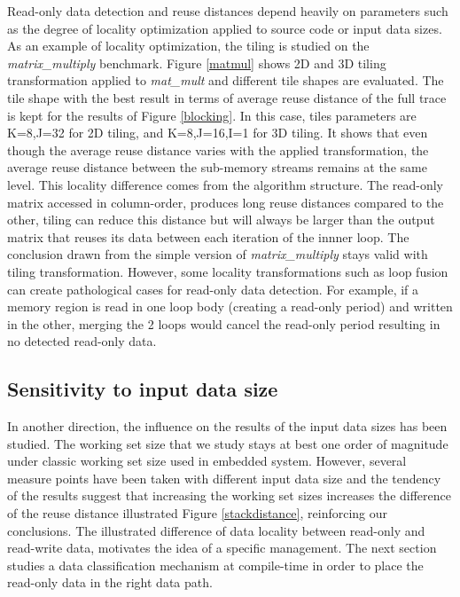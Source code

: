 \documentclass[sigconf]{acmart}
\begin{document}
Read-only data detection and reuse distances depend heavily on parameters such as the degree of locality optimization applied to source code or input data sizes. As an example of locality optimization, the tiling is studied on the \textit{matrix\_multiply} benchmark. Figure \ref{matmul} shows 2D and 3D tiling transformation applied to \textit{mat\_mult} and different tile shapes are evaluated. The tile shape with the best result in terms of average reuse distance of the full trace is kept for the results of Figure \ref{blocking}. In this case, tiles parameters are K=8,J=32 for 2D tiling, and K=8,J=16,I=1 for 3D tiling. It shows that even though the average reuse distance varies with the applied transformation, the average reuse distance between the sub-memory streams remains at the same level. This locality difference comes from the algorithm structure. The read-only matrix accessed in column-order, produces long reuse distances compared to the other, tiling can reduce this distance but will always be larger than the output matrix that reuses its data between each iteration of the innner loop.  The conclusion drawn from the simple version of \textit{matrix\_multiply} stays valid with tiling transformation. However, some locality transformations such as loop fusion can create pathological cases for read-only data detection. For example, if a memory region is read in one loop body (creating a read-only period) and written in the other, merging the 2 loops would cancel the read-only period resulting in no detected read-only data. 

\subsection{Sensitivity to input data size}

In another direction, the influence on the results of the input data sizes has been studied. The working set size that we study stays at best one order of magnitude under classic working set size used in embedded system. However, several measure points have been taken with different input data size and the tendency of the results suggest that increasing the working set sizes increases the difference of the reuse distance illustrated Figure \ref{stackdistance}, reinforcing our conclusions. The illustrated difference of data locality between read-only and read-write data, motivates the idea of a specific management. The next section studies a data classification mechanism at compile-time in order to place the read-only data in the right data path. 
\end{document}
